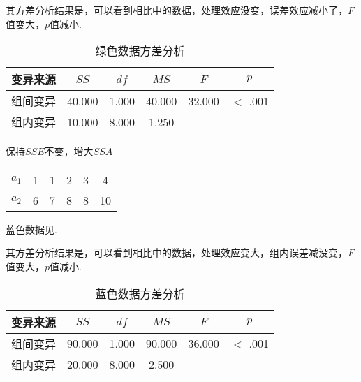 其方差分析结果是，可以看到相比中的数据，处理效应没变，误差效应减小了，$F$值变大，$p$值减小.

\begin{table}[h]
	\centering
	\caption{绿色数据方差分析}
	\label{tab:aNOVA-Score}
	{
		\begin{tabular}{cccccc}
			\toprule
			变异来源 & $SS$ & $df$ & $MS$ & $F$ & $p$  \\
			\midrule
			组间变异 & 40.000 & 1.000 & 40.000 & 32.000 & $<$ .001  \\
			组内变异 & 10.000 & 8.000 & 1.250 &  &    \\
			\bottomrule
		\end{tabular}
	}
\end{table}

\begin{margintable}
    \caption{保持$SSE$不变，增大$SSA$}
    \raggedright
    \begin{tabular}{cccccc}
        \hline
        $a_1$ & 1 & 1 & 2 & 3 & 4\\
        $a_2$ & 6 & 7 & 8 & 8 & 10\\
        \hline
    \end{tabular}
\end{margintable}

蓝色数据见.

其方差分析结果是，可以看到相比中的数据，处理效应变大，组内误差减没变，$F$值变大，$p$值减小.

\begin{table}[h]
	\centering
	\caption{蓝色数据方差分析}
	\label{tab:aNOVA-Score}
	{
		\begin{tabular}{cccccc}
			\toprule
			变异来源 & $SS$ & $df$ & $MS$ & $F$ & $p$  \\
			\midrule
			组间变异 & 90.000 & 1.000 & 90.000 & 36.000 & $<$ .001  \\
			组内变异 & 20.000 & 8.000 & 2.500 &  &    \\
			\bottomrule
		\end{tabular}
	}
\end{table}